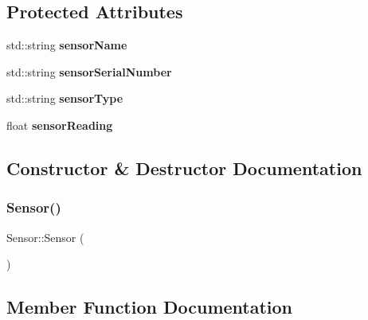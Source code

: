 \subsection*{Protected Attributes}
\begin{DoxyCompactItemize}
\item 
\mbox{\label{class_sensor_a636aa0945b0b99ccd71a02a8f552b9b5}} 
std\+::string {\bfseries sensor\+Name}
\item 
\mbox{\label{class_sensor_abecc0caf1d4129a2da059ad3f28ed741}} 
std\+::string {\bfseries sensor\+Serial\+Number}
\item 
\mbox{\label{class_sensor_ab83aea6e8f7690eb6abb6d30d97c5a94}} 
std\+::string {\bfseries sensor\+Type}
\item 
\mbox{\label{class_sensor_a3bfa0c158dc7e968bbb5990e031c7634}} 
float {\bfseries sensor\+Reading}
\end{DoxyCompactItemize}


\subsection{Constructor \& Destructor Documentation}
\mbox{\label{class_sensor_a342d6d11ef572c8cba92cb76fb1a294b}} 
\subsubsection{\texorpdfstring{Sensor()}{Sensor()}}
{\footnotesize\ttfamily Sensor\+::\+Sensor (\begin{DoxyParamCaption}{ }\end{DoxyParamCaption})}







\subsection{Member Function Documentation}
\mbox{\label{class_sensor_aa8250e5192cfd751fad294930fabf92b}} 
